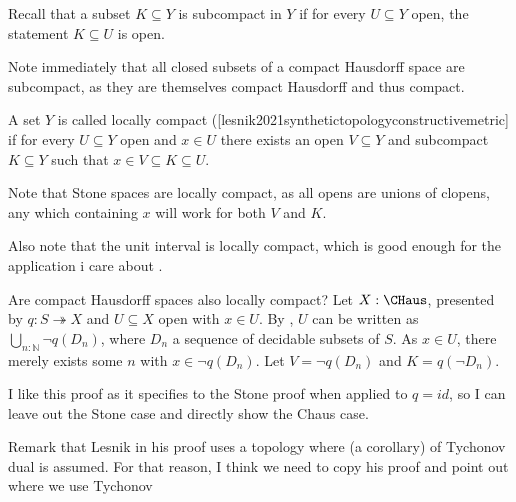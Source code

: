 Recall \parencite[Dfn 2.15]{SyntheticTopologyLesnik} that a subset $K\subseteq Y$ is subcompact in $Y$ if for every $U\subseteq Y$ open, the statement $K \subseteq U$ is open. 

Note immediately that all closed subsets of a compact Hausdorff space are subcompact, as they are themselves compact Hausdorff and thus compact.

A set $Y$ is called locally compact (\parencite{p59}[lesnik2021synthetictopologyconstructivemetric] if for every $U\subseteq Y$ open and $x\in U$ there exists an open $V\subseteq Y$ and subcompact $K\subseteq Y$ such that $x\in V \subseteq K \subseteq U$. 

Note that Stone spaces are locally compact, as all opens are unions of clopens, any which containing $x$ will work for both $V$ and $K$. 

Also note that the unit interval is locally compact, which is good enough for the application i care about \parencite[Prop 2.58]{SyntheticTopologyLesnik}.

Are compact Hausdorff spaces also locally compact? 
Let $X:\CHaus$, presented by $q:S \twoheadrightarrow X$ and $U\subseteq X$ open with $x\in U$. By \parencite[closedInCHaus]{synthetic-stone-duality}, $U$ can be written as $\bigcup_{n:\mathbb N} \neg q(D_n)$, where $D_n$ a sequence of decidable subsets of $S$. As $x\in U$, there merely exists some $n$ with $x \in \neg q(D_n)$. Let $V= \neg q(D_n)$ and $K = q(\neg D_n)$. 

I like this proof as it specifies to the Stone proof when applied to $q=id$, so I can leave out the Stone case and directly show the Chaus case. 

Remark that Lesnik in his proof uses a topology where (a corollary) of Tychonov dual is assumed. For that reason, I think we need to copy his proof and point out where we use Tychonov
